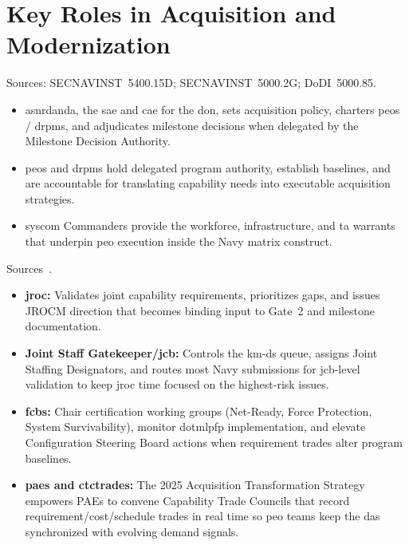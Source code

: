 \documentclass[../main.tex]{subfiles}
\begin{document}

\section{Key Roles in Acquisition and Modernization}
\begin{description}[style=nextline, labelsep=0.5em, font=\bfseries]
	\item[\textbf{Department acquisition governance.}]
	Sources: SECNAVINST~5400.15D; SECNAVINST~5000.2G; DoDI~5000.85.
      \begin{itemize}
        \item \ac{asnrdanda}, the \ac{sae} and \ac{cae} for the \ac{don}, sets acquisition policy, charters \acp{peo} / \acp{drpm}, and adjudicates milestone decisions when delegated by the Milestone Decision Authority.
        \item \acp{peo} and \acp{drpm} hold delegated program authority, establish baselines, and are accountable for translating capability needs into executable acquisition strategies.
        \item \ac{syscom} Commanders provide the workforce, infrastructure, and \ac{ta} warrants that underpin \ac{peo} execution inside the Navy matrix construct.
      \end{itemize}

\item[\textbf{Joint requirements governance.}]
Sources~\autocite{jcids-manual-2021,secwar-acq-transformation-2025}.
      \begin{itemize}
        \item \textbf{\ac{jroc}:} Validates joint capability requirements, prioritizes gaps, and issues JROCM direction that becomes binding input to Gate~2 and milestone documentation.
        \item \textbf{Joint Staff Gatekeeper/\ac{jcb}:} Controls the \ac{km-ds} queue, assigns Joint Staffing Designators, and routes most Navy submissions for \ac{jcb}-level validation to keep \ac{jroc} time focused on the highest-risk issues.
        \item \textbf{\acp{fcb}:} Chair certification working groups (Net-Ready, Force Protection, System Survivability), monitor \ac{dotmlpfp} implementation, and elevate Configuration Steering Board actions when requirement trades alter program baselines.
        \item \textbf{\acp{pae} and \acp{ctctrade}:} The 2025 Acquisition Transformation Strategy empowers PAEs to convene Capability Trade Councils that record requirement/cost/schedule trades in real time so \ac{peo} teams keep the \ac{das} synchronized with evolving demand signals.
      \end{itemize}


\end{description}
\end{document}
